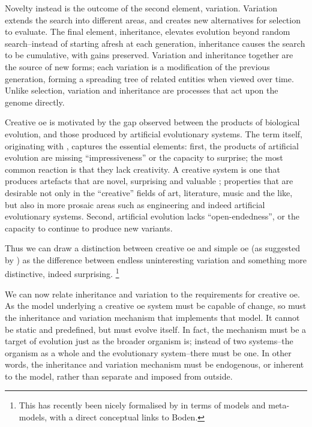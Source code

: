 Novelty instead is the outcome  of the second element, variation. Variation extends the search into different areas, and creates new alternatives for selection to evaluate. The final element, inheritance, elevates evolution beyond random search--instead of starting afresh at each generation, inheritance causes the search to be cumulative, with gains preserved. Variation and inheritance together are the source of new forms; each variation is a modification of the previous generation, forming a spreading tree of related entities when viewed over time. Unlike selection, variation and inheritance are processes that act upon the genome directly.

Creative \gls{oe} is motivated by the gap observed between the products of biological evolution, and those produced by artificial evolutionary systems. The term itself, originating with \textcite{Taylor2001}, captures the essential elements: first, the products of artificial evolution are missing ``impressiveness'' or the capacity to surprise; the most common reaction is that they lack creativity. A creative system is one that produces artefacts that are novel, surprising and valuable \parencite{Boden2004}; properties that are desirable not only in the ``creative'' fields of art, literature, music and the like, but also in more prosaic areas such as engineering and indeed artificial evolutionary systems. Second, artificial evolution lacks ``open-endedness'', or the capacity to continue to produce new variants.

Thus we can draw a distinction between creative \gls{oe} and simple \gls{oe} (as suggested by \textcite{Taylor2001}) as the difference between endless uninteresting variation and something more distinctive, indeed surprising. \footnote{This has recently been nicely formalised by \textcite{BanzhafBaumgaertnerBeslonEtAl2016} in terms of models and meta-models, with a direct conceptual links to Boden.}

We can now relate inheritance and variation to the requirements for creative \gls{oe}. As the model underlying a creative \gls{oe} system must be capable of change, so must the inheritance and variation mechanism that implements that model. It cannot be static and predefined, but must evolve itself. In fact, the mechanism must be a target of evolution just as the broader organism is; instead of two systems--the organism as a whole and the evolutionary system--there must be one. In other words, the inheritance and variation mechanism must be endogenous, or inherent to the model, rather than separate and imposed from outside.

